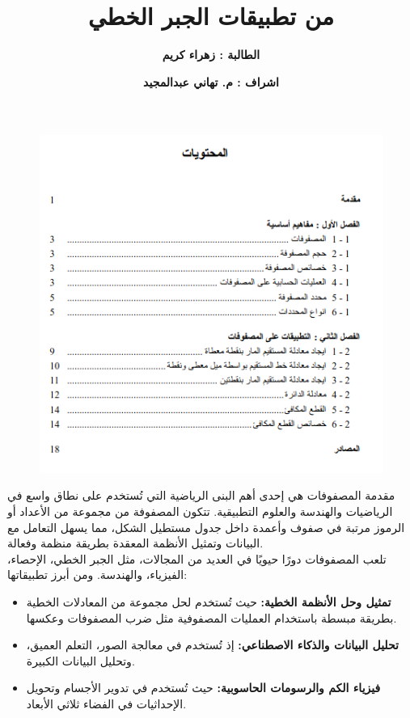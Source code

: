 

\author{\textbf{الطالبة : زهراء كريم}}
\title{\textbf{من تطبيقات الجبر الخطي}}
\date{\textbf{اشراف : م. تهاني عبدالمجيد}}

	\abovedisplayskip=0pt
	\belowdisplayskip=0pt
	\maketitle
	\timesfont
	
	\begin{frame}
		\begin{figure}
			\includegraphics[scale=0.6]{contents.png}
		\end{figure}
	\end{frame}
	
	\begin{frame}{مقدمة}
		\noindent
		المصفوفات هي إحدى أهم البنى الرياضية التي تُستخدم على نطاق واسع في الرياضيات والهندسة والعلوم التطبيقية. تتكون المصفوفة من مجموعة من الأعداد أو الرموز مرتبة في صفوف وأعمدة داخل جدول مستطيل الشكل، مما يسهل التعامل مع البيانات وتمثيل الأنظمة المعقدة بطريقة منظمة وفعالة.\\
		\noindent
		تلعب المصفوفات دورًا حيويًا في العديد من المجالات، مثل الجبر الخطي، الإحصاء، الفيزياء، والهندسة. ومن أبرز تطبيقاتها:
		\begin{itemize}
			\item \textbf{تمثيل وحل الأنظمة الخطية:} حيث تُستخدم لحل مجموعة من المعادلات الخطية بطريقة مبسطة باستخدام العمليات المصفوفية مثل ضرب المصفوفات وعكسها.
			\item \textbf{تحليل البيانات والذكاء الاصطناعي:} إذ تُستخدم في معالجة الصور، التعلم العميق، وتحليل البيانات الكبيرة.
			\item \textbf{فيزياء الكم والرسومات الحاسوبية:} حيث تُستخدم في تدوير الأجسام وتحويل الإحداثيات في الفضاء ثلاثي الأبعاد.
		\end{itemize}
	\end{frame}
	
